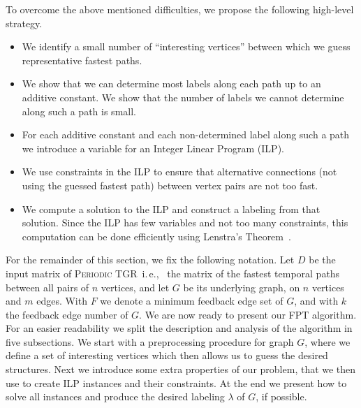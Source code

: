 \documentclass[a4paper,UKenglish,cleveref, autoref, thm-restate, anonymous]{lipics-v2021}
\newcommand{\ie}{i.\,e.,\ }
\newcommand{\deltaExact}{\textsc{Periodic TGR}}
\begin{document}
To overcome the above mentioned difficulties, we propose the following high-level strategy.
\begin{itemize}
    \item We identify a small number of ``interesting vertices'' between which we guess representative fastest paths.
    \item We show that we can determine most labels along each path up to an additive constant. We show that the number of labels we cannot determine along such a path is small. 
    \item For each additive constant and each non-determined label along such a path we introduce a variable for an Integer Linear Program (ILP). 
    \item We use constraints in the ILP to ensure that alternative connections (not using the guessed fastest path) between vertex pairs are not too fast.
    \item We compute a solution to the ILP and construct a labeling from that solution. Since the ILP has few variables and not too many constraints, this computation can be done efficiently using Lenstra's Theorem~\cite{Lenstra1983Integer}.
\end{itemize}


For the remainder of this section, we fix the following notation. 
Let $D$ be the input matrix of \deltaExact\ \ie
the matrix of the fastest temporal paths between all pairs of $n$ vertices, and let $G$ be its underlying graph, on $n$ vertices and $m$ edges.
With $F$ we denote a minimum feedback edge set of $G$, and with $k$ the feedback edge number of $G$.
We are now ready to present our FPT algorithm. For an easier readability we split the description and analysis of the algorithm in five subsections.
We start with a preprocessing procedure for graph $G$, where we define a set of interesting vertices which then allows us to guess the desired structures.
Next we introduce some extra properties of our problem, that we then use to create ILP instances and their constraints.
At the end we present how to solve all instances and produce the desired labeling $\lambda$ of $G$, if possible.
\end{document}
